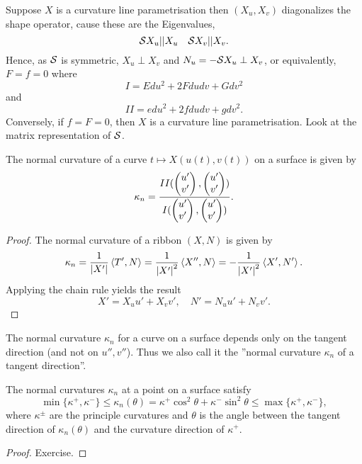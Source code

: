 \begin{remark}
	Suppose $X$ is a curvature line parametrisation then $(X_u,X_v)$ diagonalizes the shape operator, cause these are the Eigenvalues,
		\[ \mathcal S X_u || X_u \quad \mathcal S X_v || X_v. \]
	Hence, as $\mathcal S$ is symmetric, $X_u \perp X_v$ and $N_u = -\mathcal S X_u \perp X_v$, or equivalently, $F = f=0$ where
		\[ I = Edu^2 + 2Fdudv + Gdv^2 \]
	and
		\[ II = edu^2 + 2fdudv + gdv^2. \]
	Conversely, if $f=F=0$, then $X$ is a curvature line parametrisation. Look at the matrix representation of $\mathcal S$.
\end{remark}

\begin{lemma}
	The normal curvature of a curve $t \mapsto X(u(t),v(t))$ on a surface is given by 
		\[ \kappa_n = \frac {II(\begin{pmatrix} u'\\v' \end{pmatrix},\begin{pmatrix} u'\\v' \end{pmatrix})}{I (\begin{pmatrix} u'\\v' \end{pmatrix},\begin{pmatrix} u'\\v' \end{pmatrix})}. \]
\end{lemma}

\begin{proof}
	The normal curvature of a ribbon $(X,N)$ is given by
		\[ \kappa_n = \frac 1{\left| X'\right|} \left \langle T',N \right\rangle = \frac 1{\left| X'\right|^2} \left \langle X'',N \right\rangle = -\frac 1{\left| X'\right|^2} \left \langle X',N' \right\rangle. \]
	Applying the chain rule yields the result
		\[ X' = X_uu' + X_vv', \quad N' = N_uu' + N_vv'. \]
\end{proof}

\begin{remark, definition}
	The normal curvature $\kappa_n$ for a curve on a surface depends only on the tangent direction (and not on $u'', v''$). Thus we also call it the ''normal curvature $\kappa_n$ of a tangent direction''.
\end{remark, definition}

\begin{theorem}
	The normal curvatures $\kappa_n$ at a point on a surface satisfy 
		\[ \min \{ \kappa^+,\kappa^- \} \leq \kappa_n (\theta) = \kappa^+ \cos^2 \theta + \kappa^- \sin^2\theta \leq \max \{\kappa^+,\kappa^- \},  \]
	where $\kappa^\pm$ are the principle curvatures and $\theta$ is the angle between the tangent direction of $\kappa_n(\theta)$ and the curvature direction of $\kappa^+$.
\end{theorem}

\begin{proof}
	Exercise.
\end{proof}

